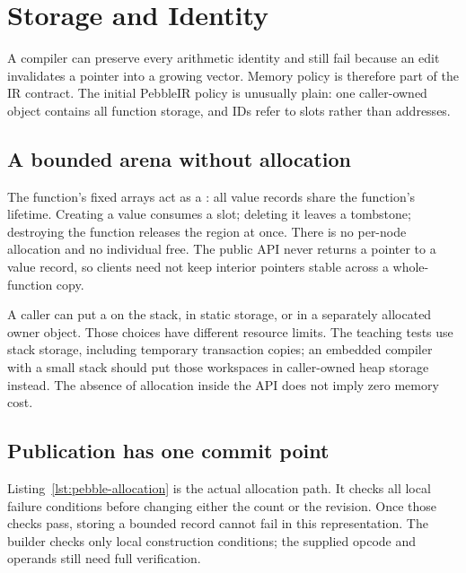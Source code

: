 \chapter{Storage and Identity}
\label{ch:pebble-storage}

A compiler can preserve every arithmetic identity and still fail because an edit invalidates a pointer into a growing vector.
Memory policy is therefore part of the IR contract.
The initial PebbleIR policy is unusually plain: one caller-owned object contains all function storage, and IDs refer to slots rather than addresses.

\section{A bounded arena without allocation}
\label{sec:pebble-arena}
The function's fixed arrays act as a : all value records share the function's lifetime.
Creating a value consumes a slot; deleting it leaves a tombstone; destroying the function releases the region at once.
There is no per-node allocation and no individual free.
The public API never returns a pointer to a value record, so clients need not keep interior pointers stable across a whole-function copy.

A caller can put a  on the stack, in static storage, or in a separately allocated owner object.
Those choices have different resource limits.
The teaching tests use stack storage, including temporary transaction copies; an embedded compiler with a small stack should put those workspaces in caller-owned heap storage instead.
The absence of allocation inside the API does not imply zero memory cost.

\section{Publication has one commit point}
\label{sec:pebble-publish}
Listing~\ref{lst:pebble-allocation} is the actual allocation path.
It checks all local failure conditions before changing either the count or the revision.
Once those checks pass, storing a bounded record cannot fail in this representation.
The builder checks only local construction conditions; the supplied opcode and operands still need full verification.

\begin{listing}[htbp]
\inputminted[firstline=22,lastline=33]{c}{example-code/pebbleir/pebbleir.c}
\caption{A failed value allocation leaves the function unchanged.}
\label{lst:pebble-allocation}
\end{listing}

